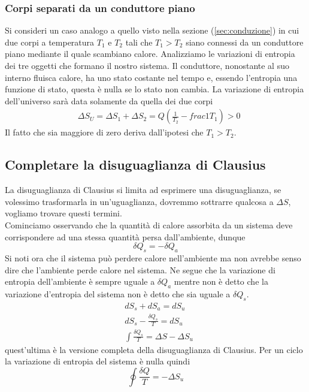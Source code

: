 \documentclass[10pt,a4paper]{article}
\begin{document}
\subsubsection{Corpi separati da un conduttore piano}
Si consideri un caso analogo a quello visto nella sezione (\ref{sec:conduzione}) in cui due corpi a temperatura \(T_1\) e \(T_2\) tali che \(T_1 > T_2\) siano connessi da un conduttore piano mediante il quale scambiano calore. Analizziamo le variazioni di entropia dei tre oggetti che formano il nostro sistema. Il conduttore, nonostante al suo interno fluisca calore, ha uno stato costante nel tempo e, essendo l'entropia una funzione di stato, questa è nulla se lo stato non cambia. La variazione di entropia dell'universo sarà data solamente da quella dei due corpi 
\begin{align*}
	&\Delta S_U = \Delta S_1 + \Delta S_2 = Q\left(\frac{1}{T_2}-frac{1}{T_1}\right)>0
\end{align*}
Il fatto che sia maggiore di zero deriva dall'ipotesi che \(T_1 > T_2\).

\subsection{Completare la disuguaglianza di Clausius}
La disuguaglianza di Clausius si limita ad esprimere una disuguaglianza, se volessimo trasformarla in un'uguaglianza, dovremmo sottrarre qualcosa a \(\Delta S\), vogliamo trovare questi termini.\\
Cominciamo osservando che la quantità di calore assorbita da un sistema deve corrispondere ad una stessa quantità persa dall'ambiente, dunque
\[\delta Q_s = -\delta Q_a\]
Si noti ora che il sistema può perdere calore nell'ambiente ma non avrebbe senso dire che l'ambiente perde calore nel sistema. Ne segue che la variazione di entropia dell'ambiente è sempre uguale a \(\delta Q_a\) mentre non è detto che la variazione d'entropia del sistema non è detto che sia uguale a \(\delta Q_s\). 
\begin{align*}
	&dS_s + dS_a = dS_u\\
	&dS_s - \frac{\delta Q_s}{T} =dS_u\\
	&\int\frac{\delta Q_s}{T} = \Delta S - \Delta S_u
\end{align*}
quest'ultima è la versione completa della disuguaglianza di Clausius. Per un ciclo la variazione di entropia del sistema è nulla quindi
\[\oint \frac{\delta Q}{T} = -\Delta S_u\]
\end{document}
